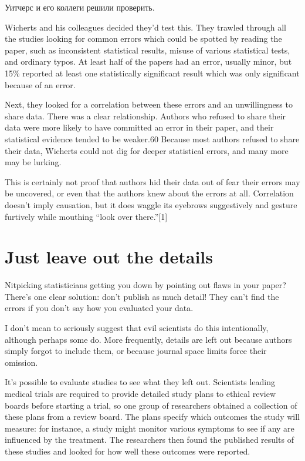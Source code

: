 Уитчерс и его коллеги решили проверить.

Wicherts and his colleagues decided they’d test this. They trawled through all the studies looking for common errors which could be spotted by reading the paper, such as inconsistent statistical results, misuse of various statistical tests, and ordinary typos. At least half of the papers had an error, usually minor, but 15\% reported at least one statistically significant result which was only significant because of an error.

Next, they looked for a correlation between these errors and an unwillingness to share data. There was a clear relationship. Authors who refused to share their data were more likely to have committed an error in their paper, and their statistical evidence tended to be weaker.60 Because most authors refused to share their data, Wicherts could not dig for deeper statistical errors, and many more may be lurking.

This is certainly not proof that authors hid their data out of fear their errors may be uncovered, or even that the authors knew about the errors at all. Correlation doesn’t imply causation, but it does waggle its eyebrows suggestively and gesture furtively while mouthing “look over there.”[1]


\section{Just leave out the details}
\label{chp10:leaveoutdetails}

Nitpicking statisticians getting you down by pointing out flaws in your paper? There’s one clear solution: don’t publish as much detail! They can’t find the errors if you don’t say how you evaluated your data.

I don’t mean to seriously suggest that evil scientists do this intentionally, although perhaps some do. More frequently, details are left out because authors simply forgot to include them, or because journal space limits force their omission.

It’s possible to evaluate studies to see what they left out. Scientists leading medical trials are required to provide detailed study plans to ethical review boards before starting a trial, so one group of researchers obtained a collection of these plans from a review board. The plans specify which outcomes the study will measure: for instance, a study might monitor various symptoms to see if any are influenced by the treatment. The researchers then found the published results of these studies and looked for how well these outcomes were reported.

